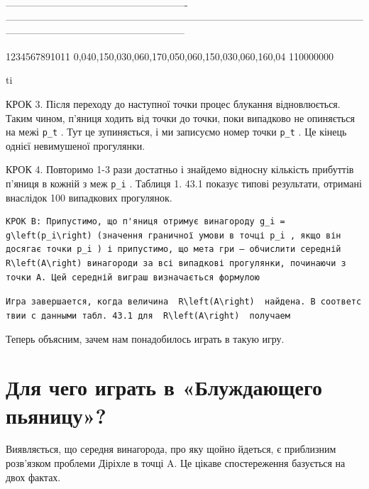 \documentclass[
  ukrainian,
]{article}
\begin{document}
\textbar-------------------------------------------------------\textbar---------------------------------------------------------------------------------------------------\textbar------------------------------------------------------------\textbar--\textbar--\textbar{}

1234567891011 \textbar{}
0,040,150,030,060,170,050,060,150,030,060,160,04 \textbar{} 110000000
\textbar{} \textbar{} \textbar{}

ti

КРОК 3. Після переходу до наступної точки процес блукання відновлюється.
Таким чином, п'яниця ходить від точки до точки, поки випадково не
опиняється на межі \texttt{p\_t} . Тут це зупиняється, і ми записуємо
номер точки \texttt{p\_t} . Це кінець однієї невимушеної прогулянки.

КРОК 4. Повторимо 1-3 рази достатньо і знайдемо відносну кількість
прибуттів п'яниця в кожній з меж \texttt{p\_i} . Таблиця 1. 43.1 показує
типові результати, отримані внаслідок 100 випадкових прогулянок.

\begin{verbatim}
КРОК B: Припустимо, що п'яниця отримує винагороду g_i = g\left(p_i\right) (значення граничної умови в точці p_i , якщо він досягає точки p_i ) і припустимо, що мета гри — обчислити середній R\left(A\right) винагороди за всі випадкові прогулянки, починаючи з точки A. Цей середній виграш визначається формулою
\end{verbatim}

\texttt{Игра\ завершается,\ когда\ величина\ \ \textquotesingle{}R\textbackslash{}left(A\textbackslash{}right)\textquotesingle{}\ \ найдена.\ В\ соответствии\ с\ данными\ табл.\ 43.1\ для\ \ \textquotesingle{}R\textbackslash{}left(A\textbackslash{}right)\textquotesingle{}\ \ получаем}

Теперь объясним, зачем нам понадобилось играть в такую игру.

\section{Для чего играть в «Блуждающего
пьяницу»?}\label{ux434ux43bux44f-ux447ux435ux433ux43e-ux438ux433ux440ux430ux442ux44c-ux432-ux431ux43bux443ux436ux434ux430ux44eux449ux435ux433ux43e-ux43fux44cux44fux43dux438ux446ux443}

Виявляється, що середня винагорода, про яку щойно йдеться, є приблизним
розв'язком проблеми Діріхле в точці A. Це цікаве спостереження базується
на двох фактах.
\end{document}
